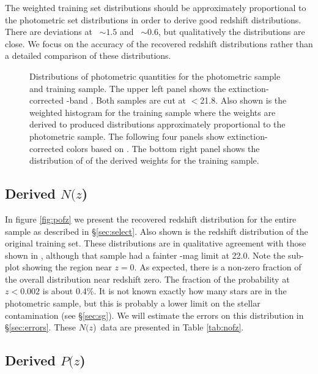 \documentclass[12pt,preprint]{aastex}
\newcommand{\rmax}{21.8}
\newcommand{\pofz}{$P(z$)}
\newcommand{\nofz}{$N(z$)}
\begin{document}
The weighted training set distributions should be approximately proportional to
the photometric set distributions in order to derive good redshift
distributions.  There are deviations at \gmr\ $\sim 1.5$ and \rmi\ $\sim 0.6$,
but qualitatively the distributions are close.  We focus on the accuracy of the
recovered redshift distributions rather than a detailed comparison of these
distributions.

\begin{figure}[p] \centering

    \caption{Distributions of photometric quantities for the photometric sample
    and training sample.  The upper left panel shows the extinction-corrected
    \rmag-band \cmodelmag.  Both samples are cut at \rmag$ < $\rmax.  Also
    shown is the weighted histogram for the training sample where the weights
    are derived to produced distributions approximately proportional to the
    photometric sample.  The following four panels show extinction-corrected
    colors based on \modelmag.  The bottom right panel shows the distribution
    of of the derived weights for the training sample. } \label{fig:varhist}

    \vspace{2em}
\end{figure}

\subsection{Derived \nofz}

In figure \ref{fig:pofz} we present the recovered redshift distribution for the
entire sample as described in \S \ref{sec:select}.  Also shown is the redshift
distribution of the original training set.  These distributions are in
qualitative agreement with those shown in \citet{CunhaPhotoz09}, although that
sample had a fainter \rmag-mag limit at 22.0.  Note the sub-plot showing the
region near $z=0$.  As expected, there is a non-zero fraction of the overall
distribution near redshift zero.  The fraction of the probability at $z <
0.002$ is about 0.4\%.  It is not known exactly how many stars are in the
photometric sample, but this is probably a lower limit on the stellar
contamination (see \S \ref{sec:sg}).  We will estimate the errors on this
distribution in \S \ref{sec:errors}. These \nofz\ data are presented in Table
\ref{tab:nofz}.


\subsection{Derived \pofz}
\end{document}
